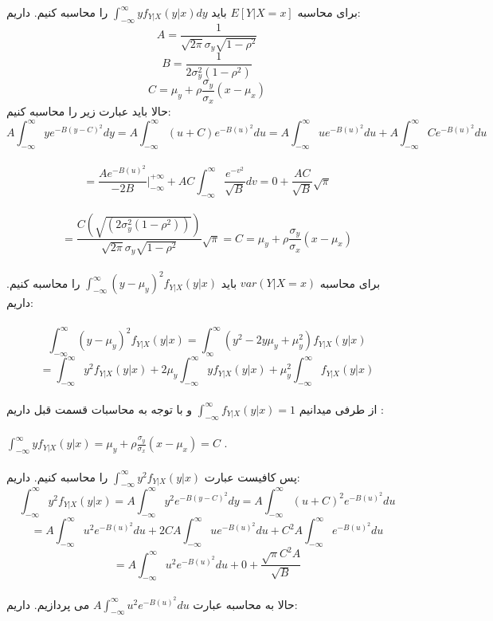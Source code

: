 \parte{}



برای محاسبه $E[Y|X=x]$ باید $\int_{-\infty}^{\infty}{y f_{Y|X}(y|x)}dy$ را محاسبه کنیم. داریم:\\
\[ A = \frac{1}{\sqrt{2\pi}\sigma_y\sqrt{1-\rho^2}}\]
\[ B = \frac{1}{2\sigma_y^2(1-\rho^2)} \]
\[ C = \mu_y+\rho\frac{\sigma_y}{\sigma_x}(x-\mu_x) \]
حالا باید عبارت زیر را محاسبه کنیم:\\
\[
    A\int_{-\infty}^{\infty}{ye^{-B(y-C)^2}}dy
    =A\int_{-\infty}^{\infty}{(u+C)e^{-B(u)^2}}du
    =A\int_{-\infty}^{\infty}{ue^{-B(u)^2}}du+A\int_{-\infty}^{\infty}{Ce^{-B(u)^2}}du
\]\\
\[
    =\frac{Ae^{-B(u)^2}}{-2B}|_{-\infty}^{+\infty}+AC\int_{-\infty}^{\infty}{\frac{e^{-v^2}}{\sqrt{B}}}dv
    = 0 +\frac{AC}{\sqrt{B}}\sqrt{\pi}
\]\\
\[
    =\frac{C(\sqrt{(2\sigma_y^2(1-\rho^2))})}{\sqrt{2\pi}\sigma_y\sqrt{1-\rho^2}}\sqrt{\pi}
    =C = \mu_y+\rho\frac{\sigma_y}{\sigma_x}(x-\mu_x)
\]\\








برای محاسبه $var(Y|X = x)$ باید 
$\int_{-\infty}^{\infty}{(y-\mu_y)^2f_{Y|X}(y|x)}$ را محاسبه کنیم.
داریم:\\\\
\[
    \int_{-\infty}^{\infty}{(y-\mu_y)^2f_{Y|X}(y|x)}
    =\int_{\infty}^{\infty}{(y^2 - 2y\mu_y +\mu_y^2 )f_{Y|X}(y|x)}
\]
\[
    =\int_{-\infty}^{\infty}{y^2f_{Y|X}(y|x)} + 2\mu_y\int_{-\infty}^{\infty}{yf_{Y|X}(y|x)} + \mu_y^2\int_{-\infty}^{\infty}{f_{Y|X}(y|x)}
\]\\

از طرفی میدانیم $\int_{-\infty}^{\infty}{f_{Y|X}(y|x)} = 1$ و با توجه به محاسبات قسمت قبل
داریم :\\\\
$\int_{-\infty}^{\infty}{yf_{Y|X}(y|x)} = \mu_y+\rho\frac{\sigma_y}{\sigma_x}(x-\mu_x) = C$ .\\\\
پس کافیست عبارت $\int_{-\infty}^{\infty}{y^2f_{Y|X}(y|x)}$ را محاسبه کنیم. داریم:\\
\[
    \int_{-\infty}^{\infty}{y^2f_{Y|X}(y|x)}
    = A\int_{-\infty}^{\infty}{y^2e^{-B(y-C)^2}}dy
    = A\int_{-\infty}^{\infty}{(u+C)^2e^{-B(u)^2}}du
\]
\[
    = A\int_{-\infty}^{\infty}{u^2e^{-B(u)^2}}du+ 2CA\int_{-\infty}^{\infty}{ue^{-B(u)^2}}du + C^2A\int_{-\infty}^{\infty}{e^{-B(u)^2}}du
\]
\[
    = A\int_{-\infty}^{\infty}{u^2e^{-B(u)^2}}du+ 0 +\frac{\sqrt{\pi}C^2A}{\sqrt{B}}
\]\\
 حالا به محاسبه عبارت $A\int_{-\infty}^{\infty}{u^2e^{-B(u)^2}}du$ می پردازیم. داریم:\\\\

